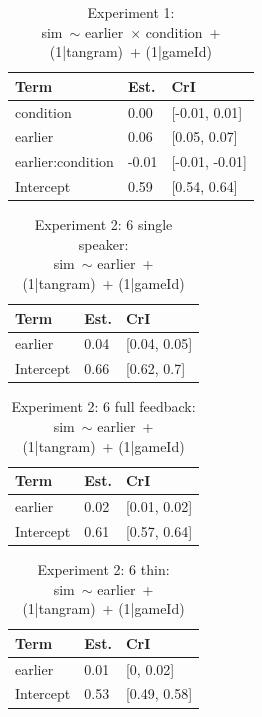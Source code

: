 \documentclass[
  english,
  a4paper,
]{article}
\begin{document}
\begin{table}[h!]

\caption{\label{tab:unnamed-chunk-15}Experiment 1:\\ sim~$\sim$ earlier~$\times$ condition~+ (1|tangram)~+ (1|gameId)}
\centering
\begin{tabular}[t]{lll}
\toprule
Term & Est. & CrI\\
\midrule
condition & 0.00 & {}[-0.01, 0.01]\\
earlier & 0.06 & {}[0.05, 0.07]\\
earlier:condition & -0.01 & {}[-0.01, -0.01]\\
Intercept & 0.59 & {}[0.54, 0.64]\\
\bottomrule
\end{tabular}
\end{table}

\begin{table}[h!]

\caption{\label{tab:unnamed-chunk-15}Experiment 2: 6 single speaker:\\ sim~$\sim$ earlier~+ (1|tangram)~+ (1|gameId)}
\centering
\begin{tabular}[t]{lll}
\toprule
Term & Est. & CrI\\
\midrule
earlier & 0.04 & {}[0.04, 0.05]\\
Intercept & 0.66 & {}[0.62, 0.7]\\
\bottomrule
\end{tabular}
\end{table}

\begin{table}[h!]

\caption{\label{tab:unnamed-chunk-15}Experiment 2: 6 full feedback:\\ sim~$\sim$ earlier~+ (1|tangram)~+ (1|gameId)}
\centering
\begin{tabular}[t]{lll}
\toprule
Term & Est. & CrI\\
\midrule
earlier & 0.02 & {}[0.01, 0.02]\\
Intercept & 0.61 & {}[0.57, 0.64]\\
\bottomrule
\end{tabular}
\end{table}

\begin{table}[h!]

\caption{\label{tab:unnamed-chunk-15}Experiment 2: 6 thin:\\ sim~$\sim$ earlier~+ (1|tangram)~+ (1|gameId)}
\centering
\begin{tabular}[t]{lll}
\toprule
Term & Est. & CrI\\
\midrule
earlier & 0.01 & {}[0, 0.02]\\
Intercept & 0.53 & {}[0.49, 0.58]\\
\bottomrule
\end{tabular}
\end{table}
\end{document}
